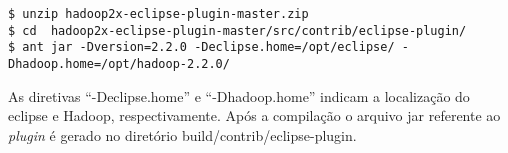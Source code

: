 \begin{apendicesenv}
\begin{lstlisting}[style=abnt,frame=single]
$ unzip hadoop2x-eclipse-plugin-master.zip
$ cd  hadoop2x-eclipse-plugin-master/src/contrib/eclipse-plugin/
$ ant jar -Dversion=2.2.0 -Declipse.home=/opt/eclipse/ -Dhadoop.home=/opt/hadoop-2.2.0/
\end{lstlisting}

As diretivas “-Declipse.home” e “-Dhadoop.home” indicam a localização do eclipse e Hadoop, respectivamente. Após a compilação o arquivo jar referente ao \textit{plugin} é gerado no diretório  build/contrib/eclipse-plugin.

\end{apendicesenv}
